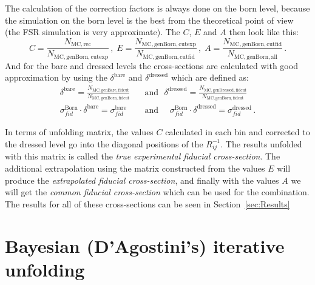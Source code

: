The calculation of the correction factors is always done on the born level, because the simulation on the born level is the best from the theoretical point of view (the FSR simulation is very approximate). The $C$, $E$ and $A$ then look like this:
\begin{equation}
C = \frac{N_\mathrm{MC, rec}}{N_\mathrm{MC, genBorn, cutexp}}\,, \;
E = \frac{N_\mathrm{MC, genBorn, cutexp}}{N_\mathrm{MC, genBorn, cutfid}}\,, \;
A = \frac{N_\mathrm{MC, genBorn, cutfid}}{N_\mathrm{MC, genBorn, all}}\,.
\end{equation}
And for the bare and dressed levels the cross-sections are calculated with good approximation by using the $\delta^\mathrm{bare}$ and $\delta^\mathrm{dressed}$ which are defined as:
\begin{equation}
\begin{split}
  \delta^\mathrm{bare} = \frac{N_\mathrm{MC, genBare, fidcut}}{N_\mathrm{MC, genBorn, fidcut}}\:\:\:&\mbox{and}\:\:\:
  \delta^\mathrm{dressed} = \frac{N_\mathrm{MC, genDressed, fidcut}}{N_\mathrm{MC, genBorn, fidcut}}\\
  \sigma_{fid}^\mathrm{Born} \cdot \delta^\mathrm{bare} =
  \sigma_{fid}^\mathrm{bare} \:\:\:\:\:\:&\mbox{and}\:\:\:\:\:\:
  \sigma_{fid}^\mathrm{Born} \cdot \delta^\mathrm{dressed} =
  \sigma_{fid}^\mathrm{dressed} \,.
\end{split}
\end{equation}

In terms of unfolding matrix, the values $C$ calculated in each bin and corrected to the dressed level go into the diagonal positions of the $R^{-1}_{ij}$. The results unfolded with this matrix is called the {\itshape true experimental fiducial cross-section}. The additional extrapolation using the matrix constructed from the values $E$ will produce the {\itshape extrapolated fiducial cross-section}, and finally with the values $A$ we will get the {\itshape common fiducial cross-section} which can be used for the combination. The results for all of these cross-sections can be seen in Section~\ref{sec:Results}

\section{Bayesian (D'Agostini's) iterative unfolding}
\label{sec:ZCS_bay_unf}

